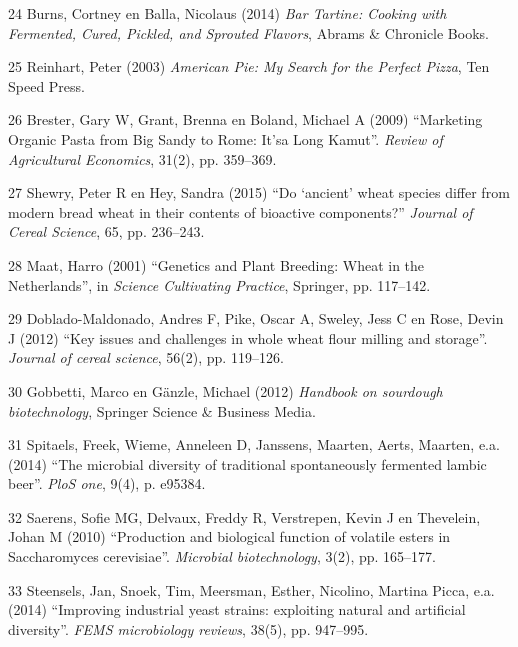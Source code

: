 \documentclass[
  11pt,
  dutch,
]{memoir}
\newlength{\cslhangindent}
\newenvironment{cslreferences}%
  {\setlength{\parindent}{0pt}%
  \everypar{\setlength{\hangindent}{\cslhangindent}}\ignorespaces}%
  {\par}
\begin{document}
\begin{cslreferences}
\leavevmode\hypertarget{ref-bartartine}{}%
24 Burns, Cortney en Balla, Nicolaus (2014) \emph{Bar Tartine: Cooking
with Fermented, Cured, Pickled, and Sprouted Flavors}, Abrams \&
Chronicle Books.

\leavevmode\hypertarget{ref-reinhartpizza}{}%
25 Reinhart, Peter (2003) \emph{American Pie: My Search for the Perfect
Pizza}, Ten Speed Press.

\leavevmode\hypertarget{ref-brester2009marketing}{}%
26 Brester, Gary W, Grant, Brenna en Boland, Michael A (2009)
``Marketing Organic Pasta from Big Sandy to Rome: It'sa Long Kamut''.
\emph{Review of Agricultural Economics}, 31(2), pp. 359--369.

\leavevmode\hypertarget{ref-shewry2015ancient}{}%
27 Shewry, Peter R en Hey, Sandra (2015) ``Do `ancient' wheat species
differ from modern bread wheat in their contents of bioactive
components?'' \emph{Journal of Cereal Science}, 65, pp. 236--243.

\leavevmode\hypertarget{ref-maat2001genetics}{}%
28 Maat, Harro (2001) ``Genetics and Plant Breeding: Wheat in the
Netherlands'', in \emph{Science Cultivating Practice}, Springer, pp.
117--142.

\leavevmode\hypertarget{ref-doblado2012key}{}%
29 Doblado-Maldonado, Andres F, Pike, Oscar A, Sweley, Jess C en Rose,
Devin J (2012) ``Key issues and challenges in whole wheat flour milling
and storage''. \emph{Journal of cereal science}, 56(2), pp. 119--126.

\leavevmode\hypertarget{ref-gobbetti2012handbook}{}%
30 Gobbetti, Marco en Gänzle, Michael (2012) \emph{Handbook on sourdough
biotechnology}, Springer Science \& Business Media.

\leavevmode\hypertarget{ref-spitaels2014microbial}{}%
31 Spitaels, Freek, Wieme, Anneleen D, Janssens, Maarten, Aerts,
Maarten, e.a. (2014) ``The microbial diversity of traditional
spontaneously fermented lambic beer''. \emph{PloS one}, 9(4), p. e95384.

\leavevmode\hypertarget{ref-saerens2010production}{}%
32 Saerens, Sofie MG, Delvaux, Freddy R, Verstrepen, Kevin J en
Thevelein, Johan M (2010) ``Production and biological function of
volatile esters in Saccharomyces cerevisiae''. \emph{Microbial
biotechnology}, 3(2), pp. 165--177.

\leavevmode\hypertarget{ref-steensels2014improving}{}%
33 Steensels, Jan, Snoek, Tim, Meersman, Esther, Nicolino, Martina
Picca, e.a. (2014) ``Improving industrial yeast strains: exploiting
natural and artificial diversity''. \emph{FEMS microbiology reviews},
38(5), pp. 947--995.


\end{cslreferences}
\end{document}
